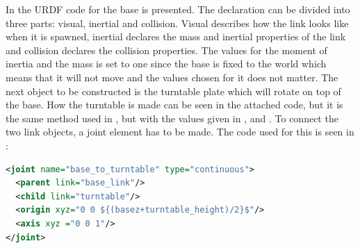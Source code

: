 In  the URDF code for the base is presented. The declaration can be divided into three parts: visual, inertial and collision. Visual describes how the link looks like when it is spawned, inertial declares the mass and inertial properties of the link and collision declares the collision properties. The values for the moment of inertia and the mass is set to one since the base is fixed to the world which means that it will not move and the values chosen for it does not matter. The next object to be constructed is the turntable plate which will rotate on top of the base. How the turntable is made can be seen in the attached code, but it is the same method used in , but with the values given in ,  and . To connect the two link objects, a joint element has to be made. The code used for this is seen in :

\begin{lstlisting}[language=xml,caption={joint between base and turntable},label={lst:jointBTT}]
<joint name="base_to_turntable" type="continuous">
  <parent link="base_link"/>
  <child link="turntable"/>
  <origin xyz="0 0 ${(basez+turntable_height)/2}$"/>
  <axis xyz ="0 0 1"/>
</joint>
\end{lstlisting}

